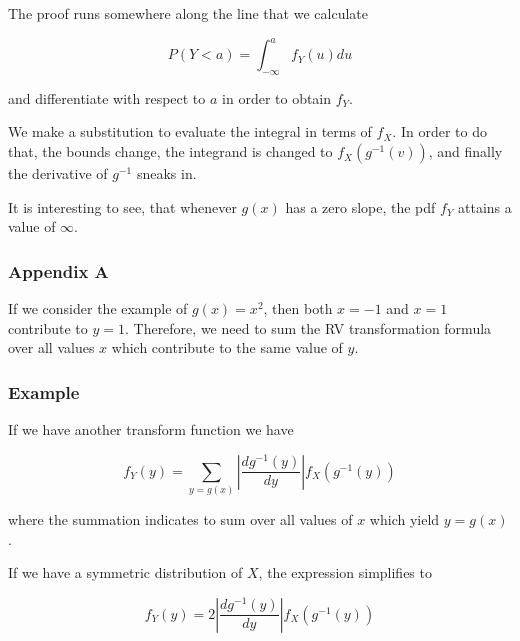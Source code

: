 

The proof runs somewhere along the line that we calculate

\[
P(Y < a) = \int_{-\infty}^a f_Y(u) du
\]

and differentiate with respect to \(a\) in order to obtain \(f_Y\).

We make a substitution to evaluate the integral in terms of \(f_X\). In
order to do that, the bounds change, the integrand is changed to
\(f_X(g^{-1}(v))\), and finally the derivative of \(g^{-1}\) sneaks in.

It is interesting to see, that whenever \(g(x)\) has a zero slope, the
pdf \(f_Y\) attains a value of \(\infty\).



\hypertarget{appendix-a}{%
\subsubsection{Appendix A}\label{appendix-a}}

If we consider the example of \(g(x) = x^2\), then both \(x=-1\) and
\(x=1\) contribute to \(y=1\). Therefore, we need to sum the RV
transformation formula over all values \(x\) which contribute to the
same value of \(y\).

\hypertarget{example}{%
\subsubsection{Example}\label{example}}



If we have another transform function we have

\[
f_Y(y) = \sum_{y = g(x)}\left| \frac{d g^{-1}(y)}{dy} \right| f_X(g^{-1}(y))
\]

where the summation indicates to sum over all values of \(x\) which
yield \(y = g(x)\).

If we have a symmetric distribution of \(X\), the expression simplifies
to

\[
f_Y(y) = 2 \left| \frac{d g^{-1}(y)}{dy} \right| f_X(g^{-1}(y))
\]
